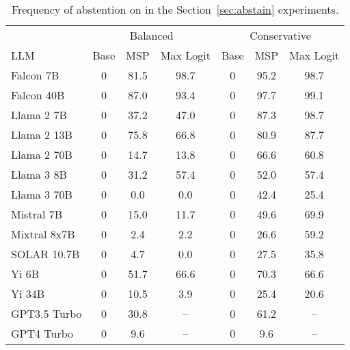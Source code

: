 \begin{table*}[h]
\centering
\caption{Frequency of abstention on  in the Section~\ref{sec:abstain} experiments.}
\label{tab:pct_abstained}
\begin{tabular}{lcccccc}
\toprule
& \multicolumn{3}{c}{Balanced} & \multicolumn{3}{c}{Conservative} \\ 
LLM & Base & MSP & Max Logit & Base & MSP & Max Logit \\ 
\cmidrule(lr){1-1}\cmidrule(lr){2-4}\cmidrule(lr){5-7} 
Falcon 7B & 0 & 81.5 & 98.7 & 0 & 95.2 & 98.7\\
Falcon 40B & 0 & 87.0 & 93.4 & 0 & 97.7 & 99.1\\
Llama 2 7B & 0 & 37.2 & 47.0 & 0 & 87.3 & 98.7\\
Llama 2 13B & 0 & 75.8 & 66.8 & 0 & 80.9 & 87.7\\
Llama 2 70B & 0 & 14.7 & 13.8 & 0 & 66.6 & 60.8\\
Llama 3 8B & 0 & 31.2 & 57.4 & 0 & 52.0 & 57.4\\
Llama 3 70B & 0 & 0.0 & 0.0 & 0 & 42.4 & 25.4\\
Mistral 7B & 0 & 15.0 & 11.7 & 0 & 49.6 & 69.9\\
Mixtral 8x7B & 0 & 2.4 & 2.2 & 0 & 26.6 & 59.2\\
SOLAR 10.7B & 0 & 4.7 & 0.0 & 0 & 27.5 & 35.8\\
Yi 6B & 0 & 51.7 & 66.6 & 0 & 70.3 & 66.6\\
Yi 34B & 0 & 10.5 & 3.9 & 0 & 25.4 & 20.6\\
GPT3.5 Turbo & 0 & 30.8 & -- & 0 & 61.2 & --\\
GPT4 Turbo & 0 & 9.6 & -- & 0 & 9.6 & --\\
\bottomrule
\end{tabular}
\end{table*}

